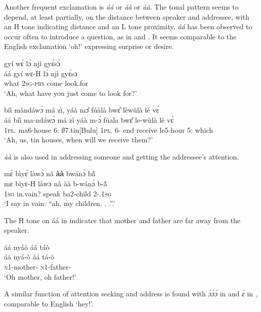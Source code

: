 Another frequent exclamation is {\itshape áá} or {\itshape áà} or {\itshape àà}. The tonal pattern seems to depend, at least partially,  on the distance between speaker and addressee, with an H tone indicating distance and an L tone proximity. {\itshape áá} has been observed to occur often to introduce a question, as in  and . It seems comparable to the English exclamation `oh!' expressing surprise or desire.

\ea \label{aa1}
   gyí wɛ́ lɔ́ njì gyɛ́sɔ̀ \\
        áá gyí wɛ-H lɔ́ njì gyɛ́sɔ \\
           {\EXCL} what 2\textsc{sg}-\textsc{prs} {\RETRO} come look.for  \\
    \trans `Ah, what have you just come to look for?'
\z

\ea \label{aa2}
   bíì màndáwɔ̀ má zì, yáà mɔ̂ fúàlà bwɛ̂ lèwùlà lé vɛ́\\
          áá bíì ma-ndáwɔ̀ má zì yáà m-ɔ́ fúala bwɛ̂ le-wùlà lé vɛ́\\
              {\EXCL} 1\textsc{pl}.{\OBJ} ma6-house 6:{\ATT} $\emptyset$7.tin[Bulu] 1\textsc{pl}.{\FUT} 6-{\OBJ} end receive le5-hour 5:{\ATT} which \\
    \trans `Ah, us, tin houses, when will we receive them?'
\z

{\itshape àà} is also used in addressing someone and getting the addressee's attention.

\ea \label{8aa3}
  \glll   mɛ̀ bìyɛ́ làwɔ̀ nâ {\bfseries àà} bwánɔ̀ bã̂ \\
           mɛ bìyɛ-H làwɔ nâ àà b-wánɔ̀ b-ã̂ \\
          1\textsc{sg} in.vain? speak {\COMP} {\EXCL} ba2-child 2-{\POSS}.1\textsc{sg} \\
    \trans `I say in vain: ``ah, my children. . .''.'
\z

\noindent The H tone on {áá} in  indicates that mother and father are far away from the speaker.

\ea \label{aa4}
  \glll áá nyáò áá táò \\
       áá nyá-ò áá tá-ò \\
       {\EXCL} \textsc{n}1-mother-{\VOC} {\EXCL} \textsc{n}1-father-{\VOC}  \\
    \trans `Oh mother, oh father!'
\z

A similar function of attention seeking and address is found with {\itshape ɔ́ɔ́ɔ́} in  and {\itshape ɛ́} in , comparable to English `hey!'.

